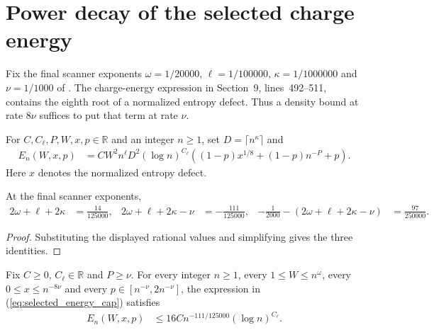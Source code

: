 \section{Power decay of the selected charge energy}
\label{sec:arealaw-source-selected-energy-power}

Fix the final scanner exponents
$\omega=1/20000$, $\ell=1/100000$, $\kappa=1/1000000$
and $\nu=1/1000$ of \cite{OpenAI2026AreaLaw}.
The charge-energy expression in Section~9, lines~492--511, contains
the eighth root of a normalized entropy defect. Thus a density bound
at rate $8\nu$ suffices to put that term at rate $\nu$.

\begin{definition}
    \label{def:arealaw-final-selected-energy-cap}
    \leanok
    For $C,C_\ell,P,W,x,p\in\mathbb R$ and an integer $n\geq1$, set
    $D=\lceil n^\kappa\rceil$ and
    \begin{align}
        E_n(W,x,p)
         & =CW^2n^\ell D^2(\log n)^{C_\ell}
        \left((1-p)x^{1/8}+(1-p)n^{-P}+p\right).
        \label{eq:selected_energy_cap}
    \end{align}
    Here $x$ denotes the normalized entropy defect.
\end{definition}

\begin{lemma}
    \label{thm:arealaw-selected-energy-margins}
    \leanok
    At the final scanner exponents,
    \begin{align}
        2\omega+\ell+2\kappa     & =\frac{14}{125000},   &
        2\omega+\ell+2\kappa-\nu & =-\frac{111}{125000}, &
        -\frac1{2000}-(2\omega+\ell+2\kappa-\nu)
                                 & =\frac{97}{250000}.
        \label{eq:selected_energy_margins}
    \end{align}
\end{lemma}

\begin{proof}
    \leanok
    Substituting the displayed rational values and simplifying gives the three identities.
\end{proof}

\begin{lemma}
    \label{thm:arealaw-selected-energy-pointwise}
    \leanok
    Fix $C\geq0$, $C_\ell\in\mathbb R$ and $P\geq\nu$.
    For every integer $n\geq1$, every $1\leq W\leq n^\omega$,
    every $0\leq x\leq n^{-8\nu}$ and every
    $p\in[n^{-\nu},2n^{-\nu}]$, the expression in
    (\ref{eq:selected_energy_cap}) satisfies
    \begin{align}
        E_n(W,x,p) & \leq16C n^{-111/125000}(\log n)^{C_\ell}.
        \label{eq:selected_energy_pointwise}
    \end{align}
\end{lemma}

